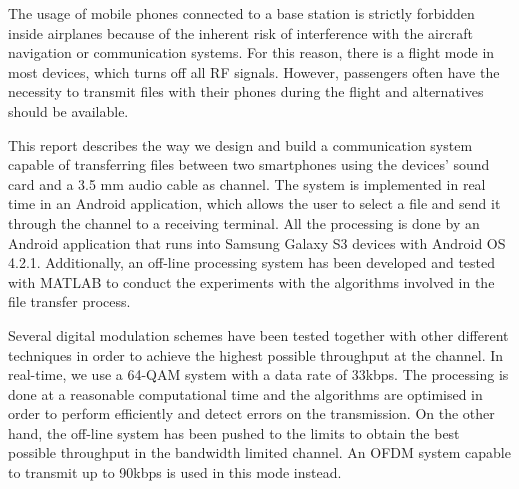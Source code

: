 \documentclass[12pt,a4paper,openright]{report}
\renewenvironment{abstract}
  {\small\quotation
  {\bfseries\noindent{\large\abstractname}\par\nobreak\smallskip}}
  {\endquotation}
\begin{document}
\begin{abstract}

The usage of mobile phones connected to a base station is strictly forbidden inside airplanes because of the inherent risk of interference with the aircraft navigation or communication systems. For this reason, there is a flight mode in most devices, which turns off all RF signals. However, passengers often have the necessity to transmit files with their phones during the flight and alternatives should be available.

This report describes the way we design and build a communication system capable of transferring files between two smartphones using the devices' sound card and a 3.5 mm audio cable as channel. The system is implemented in real time in an Android application, which allows the user to select a file and send it through the channel to a receiving terminal. All the processing is done by an Android application that runs into Samsung Galaxy S3 devices with Android OS 4.2.1. Additionally, an off-line processing system has been developed and tested with MATLAB to conduct the experiments with the algorithms involved in the file transfer process.

Several digital modulation schemes have been tested together with other different techniques in order to achieve the highest possible throughput at the channel. In real-time, we use a 64-QAM system with a data rate of 33kbps. The processing is done at a reasonable computational time and the algorithms are optimised in order to perform efficiently and detect errors on the transmission. On the other hand, the off-line system has been pushed to the limits to obtain the best possible throughput in the bandwidth limited channel. An OFDM system capable to transmit up to 90kbps is used in this mode instead.  
  


\end{abstract}

\clearpage

{\hypersetup{hidelinks}\tableofcontents}
{\hypersetup{hidelinks}\listoffigures}
{\hypersetup{hidelinks}\listoftables}
%



\clearpage

\newpage\null\thispagestyle{empty}\newpage
\end{document}
